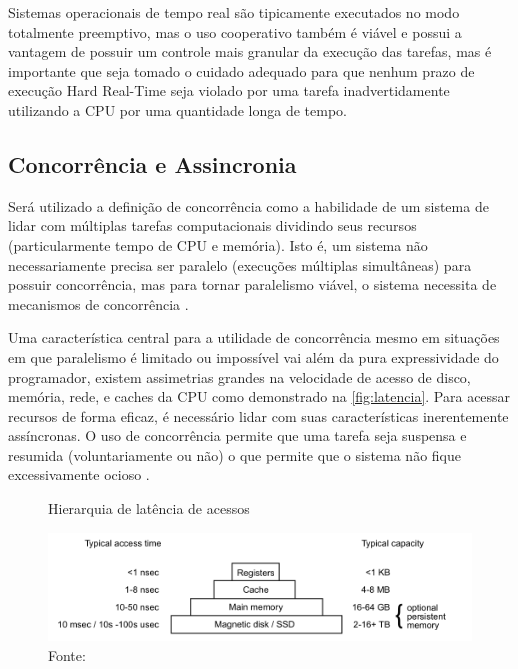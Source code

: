 Sistemas operacionais de tempo real são tipicamente executados no modo totalmente preemptivo, mas o uso cooperativo também é viável e possui a vantagem de possuir um controle mais granular da execução das tarefas, mas é importante que seja tomado o cuidado adequado para que nenhum prazo de execução Hard Real-Time seja violado por uma tarefa inadvertidamente utilizando a CPU por uma quantidade longa de tempo.

\subsection{Concorrência e Assincronia}

Será utilizado a definição de concorrência como a habilidade de um sistema de lidar com múltiplas tarefas computacionais dividindo seus recursos (particularmente tempo de CPU e memória). Isto é, um sistema não necessariamente precisa ser paralelo (execuções múltiplas simultâneas) para possuir concorrência, mas para tornar paralelismo viável, o sistema necessita de mecanismos de concorrência \cite{MakingReliableDistSystems}.

Uma característica central para a utilidade de concorrência mesmo em situações em que paralelismo é limitado ou impossível vai além da pura expressividade do programador, existem assimetrias grandes na velocidade de acesso de disco, memória, rede, e caches da CPU como demonstrado na \autoref{fig:latencia}. Para acessar recursos de forma eficaz, é necessário lidar com suas características inerentemente assíncronas. O uso de concorrência permite que uma tarefa seja suspensa e resumida (voluntariamente ou não) o que permite que o sistema não fique excessivamente ocioso \cite{OperatingSystemConcepts}.

\begin{figure}[H]
    \centering
    \captionsetup{justification=centering}
    \caption{Hierarquia de latência de acessos}
    \includegraphics[width=1.0\textwidth]{assets/latency_hierarchy.png}
    \captionsetup{justification=raggedright}
    \caption*{Fonte: }
    \label{fig:latencia}
\end{figure}

